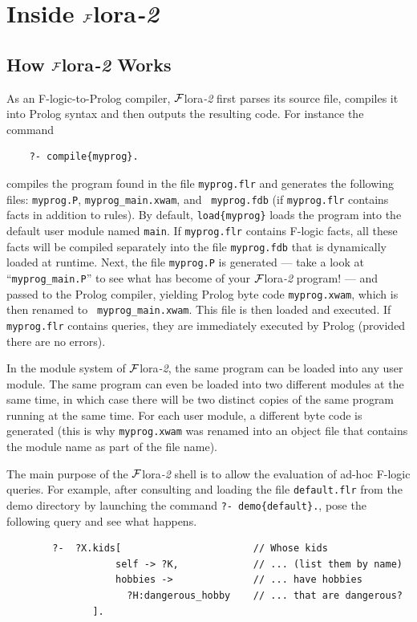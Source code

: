 \documentclass[11pt]{article}
\newcommand{\FLSYSTEM}{{\mbox{\sc ${\cal F}${lora}\rm\emph{-2}}}\xspace}
\newcommand{\flrext}{flr}
\newcommand{\fl}{\mbox{F-logic}\xspace}
\newcommand{\ofile}{xwam}
\begin{document}
\newpage
\section{Inside \FLSYSTEM}

\subsection{How \FLSYSTEM Works}


As an \fl-to-Prolog compiler, \FLSYSTEM first parses its source file,
compiles it into Prolog syntax and then outputs the resulting code. For
instance the command 
\begin{verbatim}
    ?- compile{myprog}.
\end{verbatim}
compiles the program found in the file {\tt myprog.\flrext} and generates the
following files: {\tt myprog.P}, {\tt myprog\_main.\ofile}, and {\tt
  myprog.fdb} (if {\tt myprog.\flrext} contains facts in addition to rules).
By default, {\tt load\{myprog\}} loads the program into the default user
module named {\tt main}. If {\tt myprog.\flrext} contains \fl facts, all these
facts will be compiled separately into the file {\tt myprog.fdb} that is
dynamically loaded at runtime.  Next, the file {\tt myprog.P} is generated
--- take a look at ``{\tt myprog\_main.P}'' to see what has become of your
\FLSYSTEM program! --- and passed to the Prolog compiler, yielding Prolog byte
code {\tt myprog.\ofile}, which is then renamed to {\tt
  myprog\_main.\ofile}. This file is then loaded and executed.  If {\tt
  myprog.\flrext} contains queries, they are immediately executed by Prolog
(provided there are no errors).

In the module system of \FLSYSTEM, the same program can be loaded into any
user module. The same program can even be loaded into two different
modules at the same time, in which case there will be two distinct copies
of the same program running at the same time. For each user module, a different
byte code is generated (this is why {\tt myprog.\ofile} was renamed into an
object file that contains the module name as part of the file name).

The main purpose of the \FLSYSTEM shell is to allow the evaluation
of ad-hoc \fl queries. For example, after consulting and loading the
file \texttt{default.\flrext} from the demo directory by launching
the command \texttt{?-~demo\{default\}.}, pose the following query
and see what happens.
\begin{verbatim}
        ?-  ?X.kids[                       // Whose kids
                   self -> ?K,             // ... (list them by name)
                   hobbies ->              // ... have hobbies
                     ?H:dangerous_hobby    // ... that are dangerous?
               ]. 
\end{verbatim}
\end{document}
